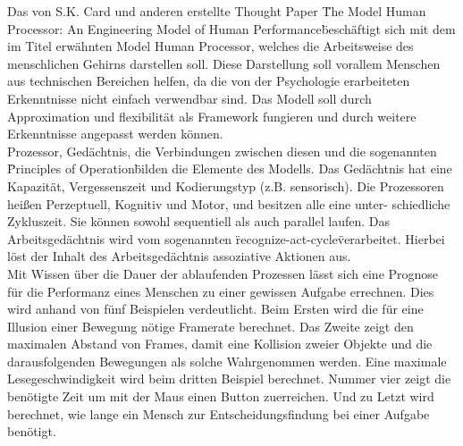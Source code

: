 \documentclass[a4paper,10pt]{article}
\begin{document}
\kopf

\renewcommand{\figurename}{Figure}

Das von S.K. Card und anderen erstellte Thought Paper \"The Model Human Processor: An Engineering Model of Human Performance\" beschäftigt sich mit dem im Titel erwähnten Model Human Processor, welches die Arbeitsweise des menschlichen Gehirns darstellen soll. Diese Darstellung soll vorallem Menschen aus technischen Bereichen helfen, da die von der Psychologie erarbeiteten Erkenntnisse nicht einfach verwendbar sind. Das Modell soll durch Approximation und flexibilität als Framework fungieren und durch weitere Erkenntnisse angepasst werden können. \\
Prozessor, Gedächtnis, die Verbindungen zwischen diesen und die sogenannten \"Principles of Operation\" bilden die Elemente des Modells. Das Gedächtnis hat eine Kapazität, Vergessenszeit und Kodierungstyp
(z.B. sensorisch). Die Prozessoren heißen Perzeptuell, Kognitiv und Motor, und besitzen alle eine unter-
schiedliche Zykluszeit. Sie können sowohl sequentiell als auch parallel laufen. Das Arbeitsgedächtnis wird vom sogenannten \"recognize-act-cycle\" verarbeitet. Hierbei löst der Inhalt des Arbeitsgedächtnis assoziative Aktionen aus. \\
Mit Wissen über die Dauer der ablaufenden Prozessen lässt sich eine Prognose für die Performanz eines Menschen zu einer gewissen Aufgabe errechnen. Dies wird anhand von fünf Beispielen verdeutlicht. Beim Ersten wird die für eine Illusion einer Bewegung nötige Framerate berechnet. Das Zweite zeigt den maximalen Abstand von Frames, damit eine Kollision zweier Objekte und die darausfolgenden Bewegungen als solche Wahrgenommen werden. Eine maximale Lesegeschwindigkeit wird beim dritten Beispiel berechnet. Nummer vier zeigt die benötigte Zeit um mit der Maus einen Button zuerreichen. Und zu Letzt wird berechnet, wie lange ein Mensch zur Entscheidungsfindung bei einer Aufgabe benötigt.\\
\end{document}
